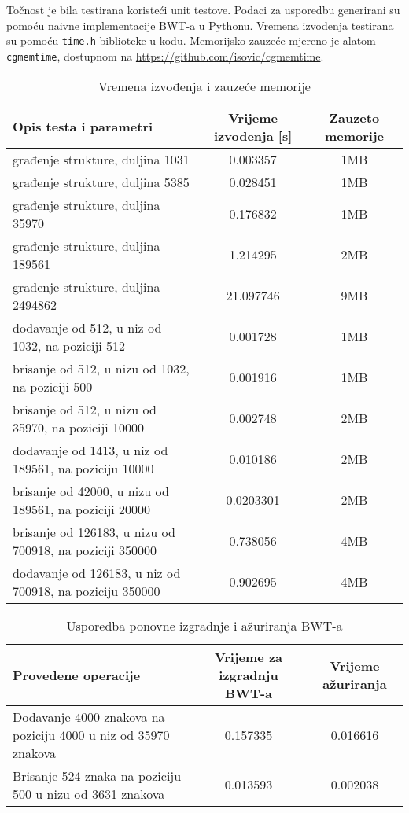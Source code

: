 \documentclass{ferseminar}
\begin{document}
Točnost je bila testirana koristeći unit testove. Podaci za usporedbu generirani su pomoću naivne implementacije BWT-a u Pythonu. Vremena izvođenja testirana su pomoću \texttt{time.h} biblioteke u kodu. Memorijsko zauzeće mjereno je alatom \texttt{cgmemtime}, dostupnom na \url{https://github.com/isovic/cgmemtime}.
\begin{table}[h]


\begin{tabular}{|m{7cm}|c|c| }
	\hline
	Opis testa i parametri & Vrijeme izvođenja [s] & Zauzeto memorije \\
	\hline
	građenje strukture, duljina 1031 & 0.003357 & 1MB \\
	\hline
	građenje strukture, duljina 5385 & 0.028451 & 1MB \\
	\hline
	građenje strukture, duljina 35970 & 0.176832 & 1MB \\
	\hline
	građenje strukture,  duljina 189561 & 1.214295 & 2MB \\
	\hline
	građenje strukture, duljina 2494862 & 21.097746 & 9MB \\
	\hline
	dodavanje od 512, u niz od 1032, na poziciji 512   & 0.001728 & 1MB \\
	\hline
	brisanje od 512, u nizu od 1032, na poziciji 500   & 0.001916 & 1MB \\
	\hline
	brisanje od 512, u nizu od 35970, na poziciji 10000   & 0.002748 & 2MB \\
	\hline
	dodavanje od 1413, u niz od 189561, na poziciju 10000   & 0.010186 & 2MB \\
	\hline
	brisanje od 42000, u nizu od 189561, na poziciji 20000   & 0.0203301 & 2MB \\
	\hline
	brisanje od 126183, u nizu od 700918, na poziciji 350000   & 0.738056 & 4MB \\
	\hline
	dodavanje od 126183, u niz od 700918, na poziciju 350000   & 0.902695 & 4MB \\
	\hline	
\end{tabular}
\caption{Vremena izvođenja i zauzeće memorije}
\label{tablica:vremena}
\end{table}
\begin{table}[h]
\begin{tabular}{|m{5cm}|c|c|}
	\hline
	Provedene operacije & Vrijeme za izgradnju BWT-a & Vrijeme ažuriranja \\
	\hline
	Dodavanje 4000 znakova na poziciju 4000 u niz od 35970 znakova & 0.157335 & 0.016616 \\
	\hline
	Brisanje 524 znaka na poziciju 500 u nizu od 3631 znakova & 0.013593 & 0.002038 \\
	\hline
\end{tabular}
\caption{Usporedba ponovne izgradnje i ažuriranja BWT-a}
\label{tablica:usporedba}
\end{table}
\end{document}
